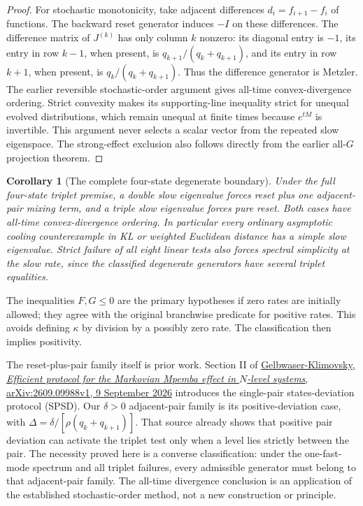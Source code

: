 \documentclass[11pt]{article}
\newtheorem{corollary}{Corollary}
\begin{document}
\begin{proof}
For stochastic monotonicity, take adjacent differences
$d_i=f_{i+1}-f_i$ of functions. The backward reset generator induces
$-I$ on these differences. The difference matrix of $J^{(k)}$ has
only column $k$ nonzero: its diagonal entry is $-1$, its entry in
row $k-1$, when present, is $q_{k+1}/(q_k+q_{k+1})$, and its entry
in row $k+1$, when present, is $q_k/(q_k+q_{k+1})$.
Thus the difference generator is Metzler. The earlier reversible
stochastic-order argument gives all-time convex-divergence ordering.
Strict convexity makes its supporting-line inequality strict for
unequal evolved distributions, which remain unequal at finite times
because $e^{tM}$ is invertible. This argument never selects a scalar
vector from the repeated slow eigenspace. The strong-effect exclusion
also follows directly from the earlier all-$G$ projection theorem.
\end{proof}

\begin{corollary}[The complete four-state degenerate boundary]
Under the full four-state triplet premise, a double slow eigenvalue
forces reset plus one adjacent-pair mixing term, and a triple slow
eigenvalue forces pure reset. Both cases have all-time convex-divergence
ordering. In particular every ordinary asymptotic cooling counterexample in KL
or weighted Euclidean distance has a simple slow eigenvalue. Strict failure of all eight linear tests
also forces spectral simplicity at the slow rate, since the classified
degenerate generators have several triplet equalities.
\end{corollary}

The inequalities $F,G\leq0$ are the primary hypotheses if zero
rates are initially allowed; they agree with the original branchwise
predicate for positive rates. This avoids defining $\kappa$ by division
by a possibly zero rate. The classification then implies positivity.

The reset-plus-pair family itself is prior work. Section II of
\href{https://arxiv.org/html/2609.09988v1}{Gelbwaser-Klimovsky,
\emph{Efficient protocol for the Markovian Mpemba effect in $N$-level
systems}, arXiv:2609.09988v1, 9 September 2026} introduces the single-pair
states-deviation protocol (SPSD). Our $\delta>0$ adjacent-pair family is
its positive-deviation case, with
$\Delta=\delta/[\rho(q_k+q_{k+1})]$. That source already shows that
positive pair deviation can activate the triplet test only when a level
lies strictly between the pair. The necessity proved here is a converse
classification: under the one-fast-mode spectrum and all triplet
failures, every admissible generator must belong to that adjacent-pair
family. The all-time divergence conclusion is an application of the
established stochastic-order method, not a new construction or principle.
\end{document}
